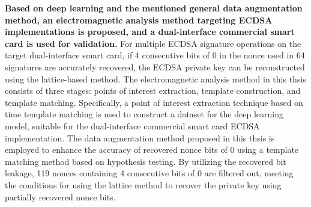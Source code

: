 \textbf{Based on deep learning and the mentioned general data augmentation method, an electromagnetic analysis method targeting ECDSA implementations is proposed, and a dual-interface commercial smart card is used for validation.} 
For multiple ECDSA signature operations on the target dual-interface smart card, if 4 consecutive bits of 0 in the nonce used in 64 signatures are accurately recovered, the ECDSA private key can be reconstructed using the lattice-based method. The electromagnetic analysis method in this thsis consists of three stages: points of interest extraction, template construction, and template matching. Specifically, a point of interest extraction technique based on time template matching is used to construct a dataset for the deep learning model, suitable for the dual-interface commercial smart card ECDSA implementation. The data augmentation method proposed in this thsis is employed to enhance the accuracy of recovered nonce bits of 0 using a template matching method based on hypothesis testing. By utilizing the recovered bit leakage, 119 nonces containing 4 consecutive bits of 0 are filtered out, meeting the conditions for using the lattice method to recover the private key using partially recovered nonce bits.
